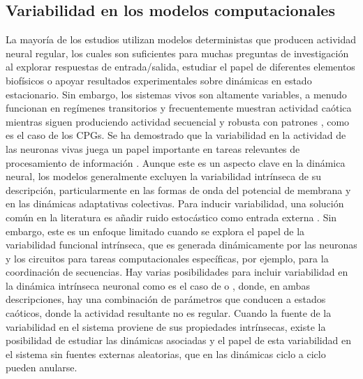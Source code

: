 \subsection{Variabilidad en los modelos computacionales}

La mayoría de los estudios utilizan modelos deterministas que producen actividad neural regular, los cuales son suficientes para muchas preguntas de investigación al explorar respuestas de entrada/salida, estudiar el papel de diferentes elementos biofísicos o apoyar resultados experimentales sobre dinámicas en estado estacionario. Sin embargo, los sistemas vivos son altamente variables, a menudo funcionan en regímenes transitorios y frecuentemente muestran actividad caótica mientras siguen produciendo actividad secuencial y robusta con patrones \parencite{selverston_reliable_2000}, como es el caso de los CPGs. Se ha demostrado que la variabilidad en la actividad de las neuronas vivas juega un papel importante en tareas relevantes de procesamiento de información \parencite{ding_dynamic_2011,renart_variability_2014,masquelier_neural_2013,hutt_intrinsic_2023,ribeiro_trialbytrial_2024}. Aunque este es un aspecto clave en la dinámica neural, los modelos generalmente excluyen la variabilidad intrínseca de su descripción, particularmente en las formas de onda del potencial de membrana y en las dinámicas adaptativas colectivas. Para inducir variabilidad, una solución común en la literatura es añadir ruido estocástico como entrada externa \parencite{linaro_accurate_2011,pezo_diffusion_2014,zheng_spontaneous_2020}. Sin embargo, este es un enfoque limitado cuando se explora el papel de la variabilidad funcional intrínseca, que es generada dinámicamente por las neuronas y los circuitos para tareas computacionales específicas, por ejemplo, para la coordinación de secuencias. Hay varias posibilidades para incluir variabilidad en la dinámica intrínseca neuronal como es el caso de \textcite{hindmarsh_model_1984} o \textcite{komendantov_deterministic_1996}, donde, en ambas descripciones, hay una combinación de parámetros que conducen a estados caóticos, donde la actividad resultante no es regular. Cuando la fuente de la variabilidad en el sistema proviene de sus propiedades intrínsecas, existe la posibilidad de estudiar las dinámicas asociadas y el papel de esta variabilidad en el sistema sin fuentes externas aleatorias, que en las dinámicas ciclo a ciclo pueden anularse.




